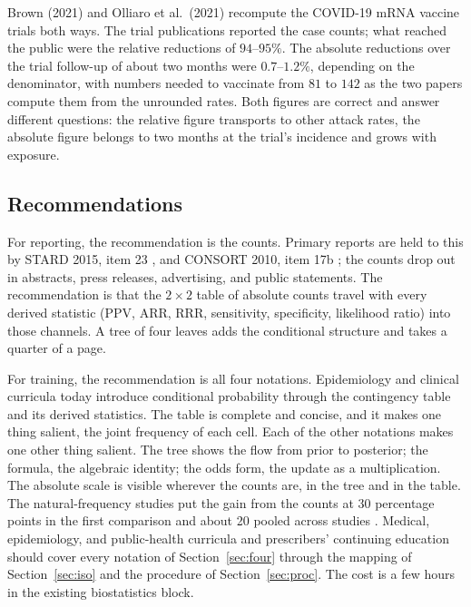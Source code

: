\documentclass[11pt]{article}
\begin{document}
Brown (2021) \cite{brown2021} and Olliaro et al.\ (2021) \cite{olliaro2021} recompute the COVID-19 mRNA vaccine trials both ways. The trial publications reported the case counts; what reached the public were the relative reductions of $94$--$95\%$. The absolute reductions over the trial follow-up of about two months were $0.7$--$1.2\%$, depending on the denominator, with numbers needed to vaccinate from $81$ to $142$ as the two papers compute them from the unrounded rates. Both figures are correct and answer different questions: the relative figure transports to other attack rates, the absolute figure belongs to two months at the trial's incidence and grows with exposure.

\subsection{Recommendations}

For reporting, the recommendation is the counts. Primary reports are held to this by STARD 2015, item 23 \cite{bossuyt2015}, and CONSORT 2010, item 17b \cite{schulz2010}; the counts drop out in abstracts, press releases, advertising, and public statements. The recommendation is that the $2\times 2$ table of absolute counts travel with every derived statistic (PPV, ARR, RRR, sensitivity, specificity, likelihood ratio) into those channels. A tree of four leaves adds the conditional structure and takes a quarter of a page.

For training, the recommendation is all four notations. Epidemiology and clinical curricula today introduce conditional probability through the contingency table and its derived statistics. The table is complete and concise, and it makes one thing salient, the joint frequency of each cell. Each of the other notations makes one other thing salient. The tree shows the flow from prior to posterior; the formula, the algebraic identity; the odds form, the update as a multiplication. The absolute scale is visible wherever the counts are, in the tree and in the table. The natural-frequency studies \cite{gigerenzer1995, hoffrage1998, binder2015, binder2018, binder2021, kunzelmann2022} put the gain from the counts at 30 percentage points in the first comparison and about 20 pooled across studies \cite{mcdowell2017}. Medical, epidemiology, and public-health curricula and prescribers' continuing education should cover every notation of Section~\ref{sec:four} through the mapping of Section~\ref{sec:iso} and the procedure of Section~\ref{sec:proc}. The cost is a few hours in the existing biostatistics block.
\end{document}
